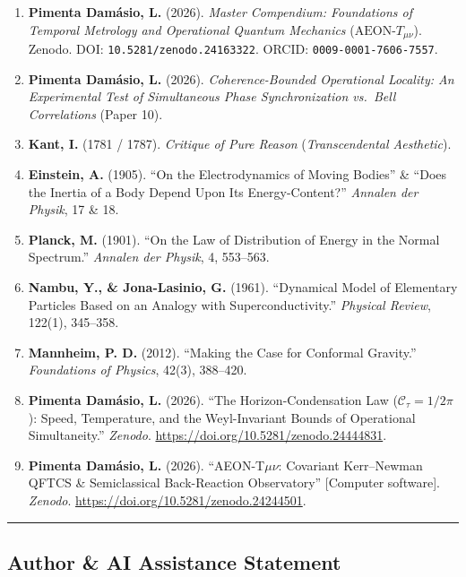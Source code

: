 \documentclass[
]{article}
\providecommand{\tightlist}{%
  \setlength{\itemsep}{0pt}\setlength{\parskip}{0pt}}
\begin{document}
\begin{enumerate}
\def\labelenumi{\arabic{enumi}.}
\tightlist
\item
  \textbf{Pimenta Damásio, L.} (2026). \emph{Master Compendium:
  Foundations of Temporal Metrology and Operational Quantum Mechanics}
  (\(\text{AEON-}T_{\mu\nu}\)). Zenodo. DOI:
  \texttt{10.5281/zenodo.24163322}. ORCID: \texttt{0009-0001-7606-7557}.
\item
  \textbf{Pimenta Damásio, L.} (2026). \emph{Coherence-Bounded
  Operational Locality: An Experimental Test of Simultaneous Phase
  Synchronization vs.~Bell Correlations} (Paper 10).
\item
  \textbf{Kant, I.} (1781 / 1787). \emph{Critique of Pure Reason}
  (\emph{Transcendental Aesthetic}).
\item
  \textbf{Einstein, A.} (1905). ``On the Electrodynamics of Moving
  Bodies'' \& ``Does the Inertia of a Body Depend Upon Its
  Energy-Content?'' \emph{Annalen der Physik}, 17 \& 18.
\item
  \textbf{Planck, M.} (1901). ``On the Law of Distribution of Energy in
  the Normal Spectrum.'' \emph{Annalen der Physik}, 4, 553--563.
\item
  \textbf{Nambu, Y., \& Jona-Lasinio, G.} (1961). ``Dynamical Model of
  Elementary Particles Based on an Analogy with Superconductivity.''
  \emph{Physical Review}, 122(1), 345--358.
\item
  \textbf{Mannheim, P. D.} (2012). ``Making the Case for Conformal
  Gravity.'' \emph{Foundations of Physics}, 42(3), 388--420.
\item
  \textbf{Pimenta Dam\'asio, L.} (2026). ``The Horizon-Condensation Law
  ($\mathcal{C}_\tau = 1/2\pi$): Speed, Temperature, and the Weyl-Invariant
  Bounds of Operational Simultaneity.'' \emph{Zenodo}.
  \url{https://doi.org/10.5281/zenodo.24444831}.
\item
  \textbf{Pimenta Dam\'asio, L.} (2026). ``AEON-T$\mu\nu$: Covariant
  Kerr--Newman QFTCS \& Semiclassical Back-Reaction Observatory'' [Computer
  software]. \emph{Zenodo}. \url{https://doi.org/10.5281/zenodo.24244501}.
\end{enumerate}

\begin{center}\rule{0.5\linewidth}{0.5pt}\end{center}

\subsection{Author \& AI Assistance
Statement}\label{author-ai-assistance-statement}
\end{document}
